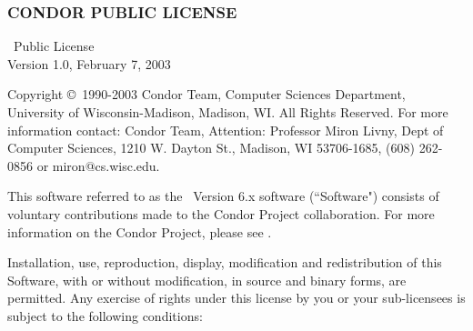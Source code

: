 \subsubsection*{\label{sec:condor-public-license}CONDOR PUBLIC LICENSE}

\begin{flushleft}
\CondorR\ Public License \\
Version 1.0, February 7, 2003
\end{flushleft}

Copyright \copyright\ 1990-2003 Condor Team, Computer Sciences Department,
University of Wisconsin-Madison, Madison, WI. All Rights Reserved.  For
more information contact: Condor Team, Attention: Professor Miron Livny,
Dept of Computer Sciences, 1210 W. Dayton St., Madison, WI 53706-1685, (608)
262-0856 or miron@cs.wisc.edu. 

This software referred to as the \CondorR\ Version 6.x software
(``Software") consists of voluntary contributions made to
the Condor Project collaboration. For more information on the Condor
Project, please see .

Installation, use, reproduction, display, modification and
redistribution of this Software, with or without modification,  in
source and binary forms, are permitted.  Any exercise of rights under
this license by you or your sub-licensees is subject to the following
conditions:

